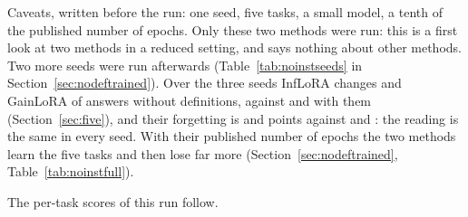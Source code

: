 Caveats, written before the run: one seed, five tasks, a small model, a tenth of the published number of epochs. Only these two methods were run: this is a first look at two methods in a reduced setting, and says nothing about other methods. Two more seeds were run afterwards (Table~\ref{tab:noinstseeds} in Section~\ref{sec:nodeftrained}). Over the three seeds InfLoRA changes \AudSeedsInfloraChanged{} and GainLoRA \AudSeedsGainloraChanged{} of \AudSeedsCompared{} answers without definitions, against \FiveInfChanged{} and \FiveGainChanged{} with them (Section~\ref{sec:five}), and their forgetting is \AudSeedsInfloraFT{} and \AudSeedsGainloraFT{} points against \FiveInfFT{} and \FiveGainFT{}: the reading is the same in every seed. With their published number of epochs the two methods learn the five tasks and then lose far more (Section~\ref{sec:nodeftrained}, Table~\ref{tab:noinstfull}).

\medskip
\noindent The per-task scores of this run follow.

\begin{table}[t]
  \caption{Per-task scores of the five-task run of Table~\ref{tab:noinstpublished} (re-test): score right after the task was learned $\to$ score at the end, Rouge-L. Columns: the two published methods with the definitions in the inputs and with none, and our \recog{} with none (plain adapters). Rows: the five tasks in their order. The last task cannot be forgotten.}
  \label{tab:noinstpertask}
  \centering
  
\end{table}
